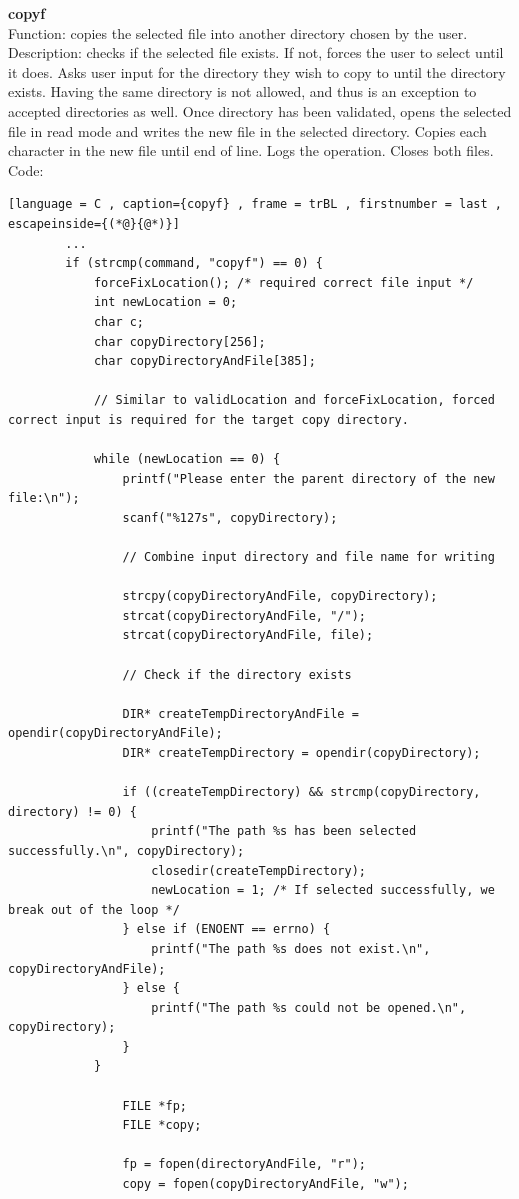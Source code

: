 \documentclass[a4paper]{article}
\theoremstyle{plain}
\theoremstyle{definition}
\theoremstyle{remark}
\begin{document}
\textbf{copyf} \\
Function: copies the selected file into another directory chosen by the user. \\
Description: checks if the selected file exists. If not, forces the user to select until it does. Asks user input for the directory they wish to copy to until the directory exists. Having the same directory is not allowed, and thus is an exception to accepted directories as well. Once directory has been validated, opens the selected file in read mode and writes the new file in the selected directory. Copies each character in the new file until end of line. Logs the operation. Closes both files. \\
Code:
\begin{lstlisting}[language = C , caption={copyf} , frame = trBL , firstnumber = last , escapeinside={(*@}{@*)}]
		...
		if (strcmp(command, "copyf") == 0) {
			forceFixLocation(); /* required correct file input */
			int newLocation = 0;
			char c;
			char copyDirectory[256];
			char copyDirectoryAndFile[385];

			// Similar to validLocation and forceFixLocation, forced correct input is required for the target copy directory.

			while (newLocation == 0) {
				printf("Please enter the parent directory of the new file:\n");
				scanf("%127s", copyDirectory);

				// Combine input directory and file name for writing

				strcpy(copyDirectoryAndFile, copyDirectory);
				strcat(copyDirectoryAndFile, "/");
				strcat(copyDirectoryAndFile, file);

				// Check if the directory exists

				DIR* createTempDirectoryAndFile = opendir(copyDirectoryAndFile);
				DIR* createTempDirectory = opendir(copyDirectory);
			
				if ((createTempDirectory) && strcmp(copyDirectory, directory) != 0) {
					printf("The path %s has been selected successfully.\n", copyDirectory);
					closedir(createTempDirectory);
					newLocation = 1; /* If selected successfully, we break out of the loop */
				} else if (ENOENT == errno) {
					printf("The path %s does not exist.\n", copyDirectoryAndFile);
				} else {
					printf("The path %s could not be opened.\n", copyDirectory);
				}
			}

				FILE *fp;
				FILE *copy;

				fp = fopen(directoryAndFile, "r");
				copy = fopen(copyDirectoryAndFile, "w");


\end{lstlisting}
\end{document}

